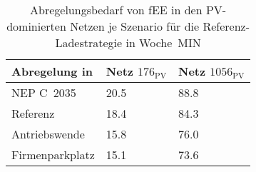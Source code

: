 {
\renewcommand{\arraystretch}{1.2}%
\begin{table}[H]
	\begin{center}
		\caption{Abregelungsbedarf von fEE in den PV-dominierten Netzen je Szenario für die Referenz-Ladestrategie in Woche~MIN}
		\begin{tabu} to 0.6\textwidth {X[1.5] X[1, r] X[1, r]}
			\toprule
			Abregelung in   \si{\mwh}    & Netz \(176_{\text{PV}}\) & Netz \(1056_{\text{PV}}\) \\ \midrule
			NEP C~\num{2035}             & \num{20.5}     & \num{88.8}      \\
			Referenz                     & \num{18.4}     & \num{84.3}      \\
			Antriebswende                & \num{15.8}     & \num{76.0}      \\
			\glqq Firmenparkplatz\grqq{} & \num{15.1}     & \num{73.6}      \\ \bottomrule
		\end{tabu}
		\label{tab:pv_dominated_week_a_fee_cur}
	\end{center}
	\vspace{-3mm}%
\end{table}
}